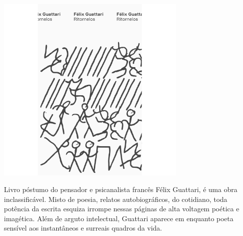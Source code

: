 \hspace*{-.4cm}\begin{minipage}[c]{.5\linewidth}
\small{
{}}
\end{minipage}

\pagebreak

\begin{center}
\hspace*{.5cm}\includegraphics[width=92mm]{./grid/guattari.jpg}
\end{center}

\hspace*{-7cm}\hrulefill\hspace*{-7cm}

\medskip

\noindent{}Livro póstumo do pensador e psicanalista francês Félix Guattari, {} é uma obra inclassificável. Misto de poesia, relatos autobiográficos, {} do cotidiano, toda potência da escrita esquiza irrompe nessas páginas de alta voltagem poética e imagética. Além de arguto intelectual, Guattari aparece em {} enquanto poeta sensível aos instantâneos e surreais quadros da vida.

